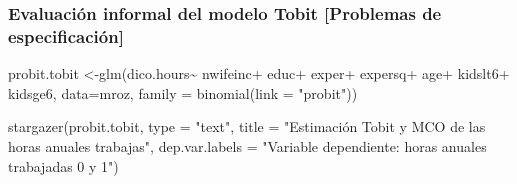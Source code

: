 \documentclass[
  letterpaper,
  DIV=11,
  numbers=noendperiod]{scrreprt}
\newenvironment{Shaded}{\begin{snugshade}}{\end{snugshade}}
\newcommand{\AttributeTok}[1]{\textcolor[rgb]{0.40,0.45,0.13}{#1}}
\newcommand{\FunctionTok}[1]{\textcolor[rgb]{0.28,0.35,0.67}{#1}}
\newcommand{\NormalTok}[1]{\textcolor[rgb]{0.00,0.23,0.31}{#1}}
\newcommand{\OtherTok}[1]{\textcolor[rgb]{0.00,0.23,0.31}{#1}}
\newcommand{\SpecialCharTok}[1]{\textcolor[rgb]{0.37,0.37,0.37}{#1}}
\newcommand{\StringTok}[1]{\textcolor[rgb]{0.13,0.47,0.30}{#1}}
\begin{document}
\subsubsection{Evaluación informal del modelo Tobit {[}Problemas de
especificación{]}}\label{evaluaciuxf3n-informal-del-modelo-tobit-problemas-de-especificaciuxf3n}

\begin{Shaded}
\begin{Highlighting}[]
\NormalTok{probit.tobit }\OtherTok{\textless{}{-}}\FunctionTok{glm}\NormalTok{(dico.hours}\SpecialCharTok{\textasciitilde{}}
\NormalTok{                nwifeinc}\SpecialCharTok{+}
\NormalTok{                 educ}\SpecialCharTok{+}
\NormalTok{                 exper}\SpecialCharTok{+}
\NormalTok{                 expersq}\SpecialCharTok{+}
\NormalTok{                 age}\SpecialCharTok{+}
\NormalTok{                 kidslt6}\SpecialCharTok{+}
\NormalTok{                 kidsge6,}
               \AttributeTok{data=}\NormalTok{mroz,}
               \AttributeTok{family =} \FunctionTok{binomial}\NormalTok{(}\AttributeTok{link =} \StringTok{"probit"}\NormalTok{)) }

\FunctionTok{stargazer}\NormalTok{(probit.tobit,}
          \AttributeTok{type =} \StringTok{"text"}\NormalTok{,}
          \AttributeTok{title =} \StringTok{"Estimación Tobit y MCO de las horas anuales trabajas"}\NormalTok{,}
          \AttributeTok{dep.var.labels =} \StringTok{"Variable dependiente: horas anuales trabajadas 0 y 1"}\NormalTok{)}
\end{Highlighting}
\end{Shaded}
\end{document}
